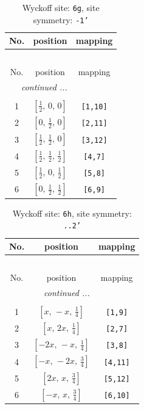 \documentclass[fleqn,8pt]{jsarticle}
\begin{document}
\renewcommand{\arraystretch}{1.2}
\begin{longtable}{ccc}
\caption{Wyckoff site: {\tt 6g}, site symmetry: {\tt -1'}}
 \\
 \hline \hline
No. & position & mapping \\ \hline \endfirsthead

\multicolumn{2}{l}{\tablename\ \thetable{}} \\
 \hline \hline
No. & position & mapping \\ \hline \endhead

 \hline \hline
\multicolumn{2}{r}{\footnotesize\it continued ...} \\ \endfoot

 \hline \hline
\multicolumn{2}{r}{} \\ \endlastfoot

1 & $\left[ \frac{1}{2},\, 0,\, 0 \right]$ & {\tt [1,10]} \\ \hline
2 & $\left[ 0,\, \frac{1}{2},\, 0 \right]$ & {\tt [2,11]} \\ \hline
3 & $\left[ \frac{1}{2},\, \frac{1}{2},\, 0 \right]$ & {\tt [3,12]} \\ \hline
4 & $\left[ \frac{1}{2},\, \frac{1}{2},\, \frac{1}{2} \right]$ & {\tt [4,7]} \\ \hline
5 & $\left[ \frac{1}{2},\, 0,\, \frac{1}{2} \right]$ & {\tt [5,8]} \\ \hline
6 & $\left[ 0,\, \frac{1}{2},\, \frac{1}{2} \right]$ & {\tt [6,9]} \\
\end{longtable}
\renewcommand{\arraystretch}{1.2}
\begin{longtable}{ccc}
\caption{Wyckoff site: {\tt 6h}, site symmetry: {\tt ..2'}}
 \\
 \hline \hline
No. & position & mapping \\ \hline \endfirsthead

\multicolumn{2}{l}{\tablename\ \thetable{}} \\
 \hline \hline
No. & position & mapping \\ \hline \endhead

 \hline \hline
\multicolumn{2}{r}{\footnotesize\it continued ...} \\ \endfoot

 \hline \hline
\multicolumn{2}{r}{} \\ \endlastfoot

1 & $\left[ x,\, - x,\, \frac{1}{4} \right]$ & {\tt [1,9]} \\ \hline
2 & $\left[ x,\, 2 x,\, \frac{1}{4} \right]$ & {\tt [2,7]} \\ \hline
3 & $\left[ - 2 x,\, - x,\, \frac{1}{4} \right]$ & {\tt [3,8]} \\ \hline
4 & $\left[ - x,\, - 2 x,\, \frac{3}{4} \right]$ & {\tt [4,11]} \\ \hline
5 & $\left[ 2 x,\, x,\, \frac{3}{4} \right]$ & {\tt [5,12]} \\ \hline
6 & $\left[ - x,\, x,\, \frac{3}{4} \right]$ & {\tt [6,10]} \\
\end{longtable}
\end{document}
